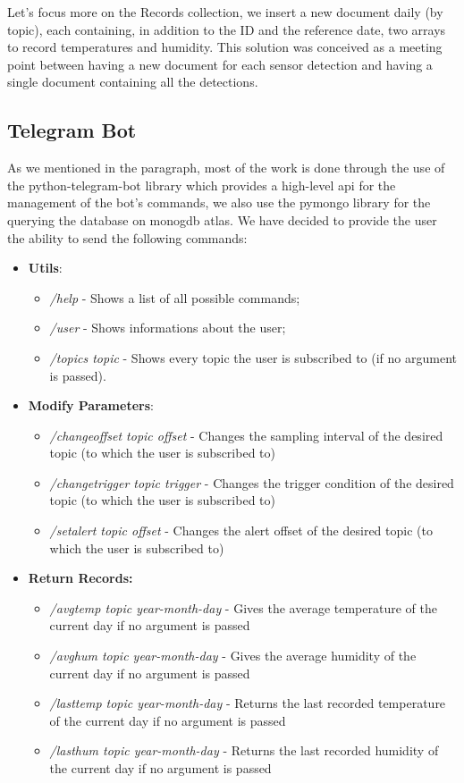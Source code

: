 Let's focus more on the Records collection, we insert a new document daily (by topic), each containing, in addition to the ID and the reference date, two arrays to record temperatures and humidity. This solution was conceived as a meeting point between having a new document for each sensor detection and having a single document containing all the detections.

\subsection{Telegram Bot}
As we mentioned in the \textbf{} paragraph, most of the work is done through the use of the python-telegram-bot library which provides a high-level api for the management of the bot's commands, we also use the pymongo library for the querying the database on monogdb atlas. We have decided to provide the user the ability to send the following commands:
\begin{itemize}
    \item \textbf{Utils}:
    \begin{itemize}
        \item \textit{/help} - Shows a list of all possible commands;
        \item \textit{/user} - Shows informations about the user;
        \item \textit{/topics topic} - Shows every topic the user is subscribed to (if no argument is passed).
    \end{itemize}
    \item \textbf{Modify Parameters}:
    \begin{itemize}
        \item \textit{/changeoffset topic offset} - Changes the sampling interval of the desired topic (to which the user is subscribed to)
        \item \textit{/changetrigger topic trigger} - Changes the trigger condition of the desired topic (to which the user is subscribed to)
        \item \textit{/setalert topic offset} - Changes the alert offset of the desired topic (to which the user is  subscribed to)
    \end{itemize}
    \item \textbf{Return Records:}
    \begin{itemize}
        \item \textit{/avgtemp topic year-month-day} - Gives the average temperature of the current day if no argument is passed
        \item\textit{/avghum topic year-month-day} - Gives the average humidity of the current day if no argument is passed
        \item \textit{/lasttemp topic year-month-day} - Returns the last recorded temperature of the current day if no argument is passed
        \item \textit{/lasthum topic year-month-day} - Returns the last recorded humidity of the current day if no argument is passed
    \end{itemize}
\end{itemize}
